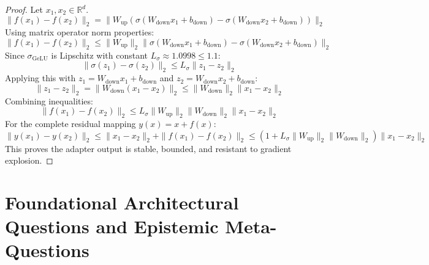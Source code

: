 \documentclass[11pt,a4paper]{article}
\theoremstyle{definition}
\begin{document}
\begin{proof}
Let $x_1, x_2 \in \mathbb{R}^d$.
{\boldmath
\begin{equation}
\|f(x_1) - f(x_2)\|_2 = \|W_{\text{up}} (\sigma(W_{\text{down}} x_1 + b_{\text{down}}) - \sigma(W_{\text{down}} x_2 + b_{\text{down}}))\|_2
\end{equation}
}
Using matrix operator norm properties:
{\boldmath
\begin{equation}
\|f(x_1) - f(x_2)\|_2 \le \|W_{\text{up}}\|_2 \|\sigma(W_{\text{down}} x_1 + b_{\text{down}}) - \sigma(W_{\text{down}} x_2 + b_{\text{down}})\|_2
\end{equation}
}
Since $\sigma_{\text{GeLU}}$ is Lipschitz with constant $L_\sigma \approx 1.0998 \le 1.1$:
{\boldmath
\begin{equation}
\|\sigma(z_1) - \sigma(z_2)\|_2 \le L_\sigma \|z_1 - z_2\|_2
\end{equation}
}
Applying this with $z_1 = W_{\text{down}} x_1 + b_{\text{down}}$ and $z_2 = W_{\text{down}} x_2 + b_{\text{down}}$:
{\boldmath
\begin{equation}
\|z_1 - z_2\|_2 = \|W_{\text{down}} (x_1 - x_2)\|_2 \le \|W_{\text{down}}\|_2 \|x_1 - x_2\|_2
\end{equation}
}
Combining inequalities:
{\boldmath
\begin{equation}
\|f(x_1) - f(x_2)\|_2 \le L_\sigma \|W_{\text{up}}\|_2 \|W_{\text{down}}\|_2 \|x_1 - x_2\|_2
\end{equation}
}
For the complete residual mapping $y(x) = x + f(x)$:
{\boldmath
\begin{equation}
\|y(x_1) - y(x_2)\|_2 \le \|x_1 - x_2\|_2 + \|f(x_1) - f(x_2)\|_2 \le \left( 1 + L_\sigma \|W_{\text{up}}\|_2 \|W_{\text{down}}\|_2 \right) \|x_1 - x_2\|_2
\end{equation}
}
This proves the adapter output is stable, bounded, and resistant to gradient explosion.
\end{proof}

\section{Foundational Architectural Questions and Epistemic Meta-Questions}
\end{document}
